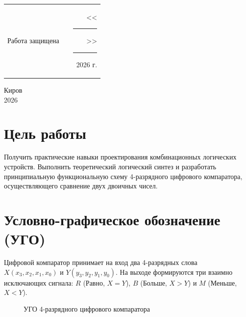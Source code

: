 \documentclass[oneside,a4paper,14pt]{extarticle}
\begin{document}
\noindent
\begin{tabular}{lp{58mm}r}
  Работа защищена &  & \hspace{8mm}<<\rule[-1mm]{8mm}{0.10mm}\/>>\rule[-1mm]{38mm}{0.10mm}\ 2026 г.
\end{tabular}
\vfill

\begin{center}
  Киров\\
  2026
\end{center}

\newpage\thispagestyle{plain}

\section{Цель работы}
Получить практические навыки проектирования комбинационных логических устройств. Выполнить теоретический логический синтез и разработать принципиальную функциональную схему 4-разрядного цифрового компаратора, осуществляющего сравнение двух двоичных чисел.

\section{Условно-графическое обозначение (УГО)}
Цифровой компаратор принимает на вход два 4-разрядных слова $X (x_3, x_2, x_1, x_0)$ и $Y (y_3, y_2, y_1, y_0)$. На выходе формируются три взаимно исключающих сигнала: $R$ (Равно, $X=Y$), $B$ (Больше, $X>Y$) и $M$ (Меньше, $X<Y$).

\begin{figure}[H]
  \centering
  \caption{УГО 4-разрядного цифрового компаратора}
\end{figure}
\end{document}
